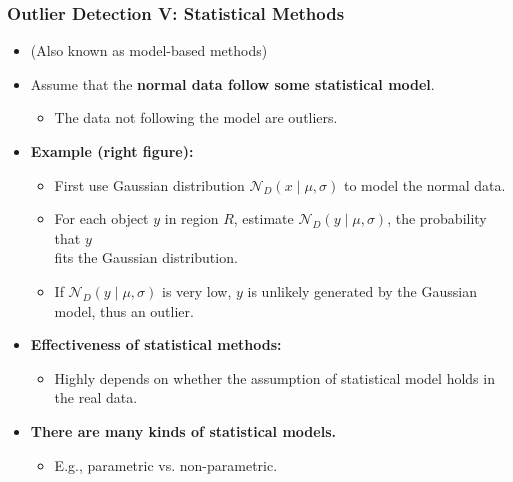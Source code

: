 \begin{frame}
	\frametitle{Outlier Detection V: Statistical Methods}
	\begin{itemize}
		\item (Also known as model-based methods)
		\item Assume that the \textbf{\color{airforceblue}normal data follow some statistical model}.
		      \begin{itemize}
			      \item The data not following the model are outliers.
		      \end{itemize}
		\item \textbf{Example (right figure):}
		      \begin{itemize}
			      \item First use Gaussian distribution $\mathcal{N}_D(x \; \vert \; \mu,\sigma)$ to model the normal data.
			      \item For each object $y$ in region $R$, estimate $\mathcal{N}_D(y \; \vert \; \mu, \sigma)$, the probability that $y$ \\
			            fits the Gaussian distribution.
			      \item If $\mathcal{N}_D(y \; \vert \; \mu, \sigma)$ is very low, $y$ is unlikely generated by the Gaussian model, thus an outlier.
		      \end{itemize}
		      \item\textbf{Effectiveness of statistical methods:}
		      \begin{itemize}
			      \item Highly depends on whether the assumption of statistical model holds in the real data.
		      \end{itemize}
		\item \textbf{There are many kinds of statistical models.}
		      \begin{itemize}
			      \item E.g., parametric vs. non-parametric.
		      \end{itemize}
	\end{itemize}


\end{frame}
